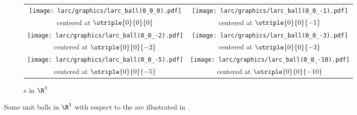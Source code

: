 \begin{figure}
  \centering%
  \begin{tabstr}{0.75}\begin{tabular}{cc}
        \texttt{[image: larc/graphics/larc\_ball(0\_0\_0).pdf]} 
      & \texttt{[image: larc/graphics/larc\_ball(0\_0\_-1).pdf]} 
      \\centered at $\otriple{0}{0}{0}$
      & centered at $\otriple{0}{0}{-1}$
    \\
        \texttt{[image: larc/graphics/larc\_ball(0\_0\_-2).pdf]} 
      & \texttt{[image: larc/graphics/larc\_ball(0\_0\_-3).pdf]} 
      \\centered at $\otriple{0}{0}{-2}$
      & centered at $\otriple{0}{0}{-3}$
    \\
        \texttt{[image: larc/graphics/larc\_ball(0\_0\_-5).pdf]} 
      & \texttt{[image: larc/graphics/larc\_ball(0\_0\_-10).pdf]} 
      \\centered at $\otriple{0}{0}{-5}$
      & centered at $\otriple{0}{0}{-10}$
  \end{tabular}\end{tabstr}
  \caption{s in $\R^3$ \label{fig:larcR3}}
\end{figure}
\begin{example}
\label{ex:larcR3balls}
Some unit balls in $\R^3$ with respect to the  are illustrated in .
\end{example}





